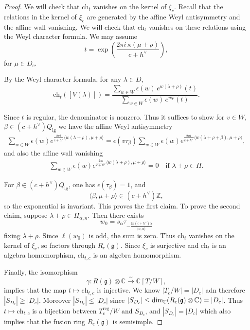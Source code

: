 \documentclass[12pt]{article}
\begin{document}
\begin{proof} We will check that $\mathrm{ch}_t$ vanishes on the kernel of $\xi_c$. Recall that the relations in the kernel of $\xi_c$ are generated by the affine Weyl antisymmetry and the affine wall vanishing. We will check that $\mathrm{ch}_t$ vanishes on these relations using the Weyl character formula. We may assume
\[
t = \exp\left( \frac{2\pi i\,\kappa(\mu+\rho)}{c+h^\vee} \right),
\] for $\mu \in D_c$. 

By the Weyl character formula, for any $\lambda \in D$,
\[
\mathrm{ch}_t([V(\lambda)]) =
\frac{\sum_{w\in W} \epsilon(w)\, e^{w(\lambda+\rho)}(t)}
     {\sum_{w\in W} \epsilon(w)\, e^{w\rho}(t)}.
\]

Since $t$ is regular, the denominator is nonzero. Thus it suffices to show for $v\in W$, $\beta \in (c+h^\vee)Q_{\mathrm{lg}}$ we have the affine Weyl antisymmetry
\begin{align*}
\sum_{w\in W} \epsilon(w)
e^{\frac{2\pi i}{c+h^\vee}\langle w(\lambda+\rho),\mu+\rho\rangle}
=
\epsilon(v\tau_\beta)
\sum_{w\in W} \epsilon(w)
e^{\frac{2\pi i}{c+h^\vee}\langle w(\lambda+\rho+\beta),\mu+\rho\rangle},
\end{align*}
and also the affine wall vanishing
\begin{align*}
\sum_{w\in W} \epsilon(w)
e^{\frac{2\pi i}{c+h^\vee}\langle w(\lambda+\rho),\mu+\rho\rangle}
=0
\quad \text{if } \lambda+\rho \in H.
\end{align*}

For $\beta \in (c+h^\vee)Q_{\mathrm{lg}}$, one has $\epsilon(\tau_\beta)=1$, and
\[
\langle \beta,\mu+\rho\rangle \in (c+h^\vee)\mathbb Z,
\]
so the exponential is invariant. This proves the first claim. 
To prove the second claim, suppose $\lambda+\rho \in H_{\alpha,n}$. Then there exists
\[
w_0 = s_\alpha \tau_{-\frac{2n(c+h^\vee)\alpha}{\langle \alpha,\alpha\rangle}}
\]
fixing $\lambda+\rho$. Since $\ell(w_0)$ is odd, the sum is zero. Thus $\mathrm{ch}_t$ vanishes on the kernel of $\xi_c$, so factors through $R_c(\mathfrak g)$. Since $\xi_c$ is surjective and $\mathrm{ch}_t$ is an algebra homomorphism,
$\mathrm{ch}_{t,c}$ is an algebra homomorphism.

Finally, the isomorphism
\[
\gamma : R(\mathfrak g)\otimes \mathbb C \xrightarrow{\sim} \mathbb C[T/W],
\]
implies that the map $t\mapsto \mathrm{ch}_{t,c}$ is injective. We know $|T_c/W|=|D_c|$ adn therefore $|S_{D_c}| \geq |D_c|$. Moreover $|S_{D_c}| \leq |D_c|$ since $|S_{D_c}| \le \dim_{\mathbb{C}} (R_c(\mathfrak g) \otimes \mathbb C) = |D_c|$. Thus $t\mapsto \mathrm{ch}_{t,c}$ is a bijection between $T_c^{\mathrm{reg}}/W$ and $S_{D_c}$, and $|S_{D_c}|=|D_c|$ which also implies that the fusion ring $R_c(\mathfrak g)$ is semisimple.
\end{proof}
\end{document}
